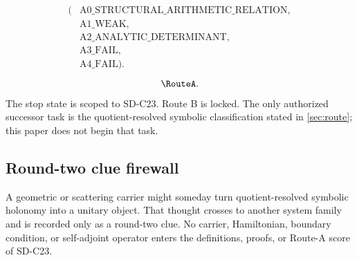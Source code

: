 \[
\begin{aligned}
(&\mathrm{A0\_STRUCTURAL\_ARITHMETIC\_RELATION},\\
 &\mathrm{A1\_WEAK},\\
 &\mathrm{A2\_ANALYTIC\_DETERMINANT},\\
 &\mathrm{A3\_FAIL},\\
 &\mathrm{A4\_FAIL}).
\end{aligned}
\]
\[
\RouteA.
\]
The stop state is scoped to SD-C23.  Route B is locked.  The only authorized
successor task is the quotient-resolved symbolic classification stated in
\cref{sec:route}; this paper does not begin that task.

\subsection{Round-two clue firewall}

A geometric or scattering carrier might someday turn quotient-resolved
symbolic holonomy into a unitary object.  That thought crosses to another
system family and is recorded only as a round-two clue.  No carrier,
Hamiltonian, boundary condition, or self-adjoint operator enters the
definitions, proofs, or Route-A score of SD-C23.
